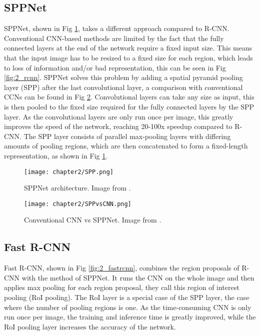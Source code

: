 \subsection{SPPNet \cite{sppnet}}
SPPNet, shown in Fig \ref{fig:2_sppnet}, takes a different approach compared to R-CNN. Conventional CNN-based methods are limited by the fact that the fully connected layers at the end of the network require a fixed input size. This means that the input image has to be resized to a fixed size for each region, which leads to loss of information and/or bad representation, this can be seen in Fig \ref{fig:2_rcnn}. SPPNet solves this problem by adding a spatial pyramid pooling layer (SPP) after the last convolutional layer, a comparison with conventional CCNs can be found in Fig \ref{fig:2_sppnetvscnn}. Convolutional layers can take any size as input, this is then pooled to the fixed size required for the fully connected layers by the SPP layer. As the convolutional layers are only run once per image, this greatly improves the speed of the network, reaching 20-100x speedup compared to R-CNN. The SPP layer consists of parallel max-pooling layers with differing amounts of pooling regions, which are then concatenated to form a fixed-length representation, as shown in Fig \ref{fig:2_sppnet}.

\begin{figure}[H]
	\centering
	\texttt{[image: chapter2/SPP.png]}
	\caption{\label{fig:2_sppnet} SPPNet architecture. Image from \citet{sppnet}.}
\end{figure}

\begin{figure}[H]
	\centering
	\texttt{[image: chapter2/SPPvsCNN.png]}
	\caption{\label{fig:2_sppnetvscnn} Conventional CNN vs SPPNet. Image from \citet{sppnet}.}
\end{figure}

\subsection{Fast R-CNN \cite{fastrcnn}}
Fast R-CNN, shown in Fig \ref{fig:2_fastrcnn}, combines the region proposals of R-CNN with the method of SPPNet. It runs the CNN on the whole image and then applies max pooling for each region proposal, they call this region of interest pooling (RoI pooling). The RoI layer is a special case of the SPP layer, the case where the number of pooling regions is one. As the time-consuming CNN is only run once per image, the training and inference time is greatly improved, while the RoI pooling layer increases the accuracy of the network.

